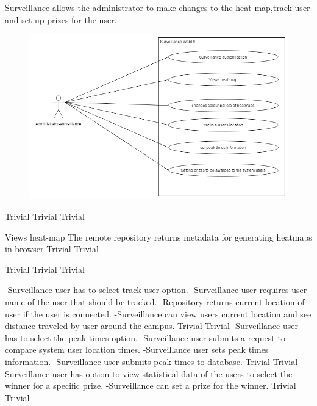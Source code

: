 Surveillance allows the administrator to make changes to the heat map,track user and set up prizes for the user.
\bigskip
\begin{figure}[h]
  \includegraphics[width=\textwidth]{diagrams/Specific_Requirements/surveillance_webUI.png}
\end{figure}

 		{Trivial}
    {Trivial}
    {Trivial}

\FuncReq
    { Views heat-map}
		{The remote repository returns metadata for generating heatmaps in browser}
    {Trivial}
    {Trivial}

		{Trivial}
    {Trivial}
    {Trivial}
	
		{-Surveillance user has to select track user option.
		-Surveillance user requires user-name of the user that should be tracked.
		-Repository returns current location of user if the user is connected.
		-Surveillance can view users current location and see distance traveled by user around the campus.}
    {Trivial}
    {Trivial}
		{-Surveillance user has to select the peak times option.
		-Surveillance user submits a request to compare system user location times.
		-Surveillance user sets peak times information.
		-Surveillance user submits peak times to database.}
    {Trivial}
    {Trivial}
		{-Surveillance user has option to view statistical data of the users to select the winner for a specific prize.
		 -Surveillance can set a prize for the winner.}
    {Trivial}
    {Trivial}
